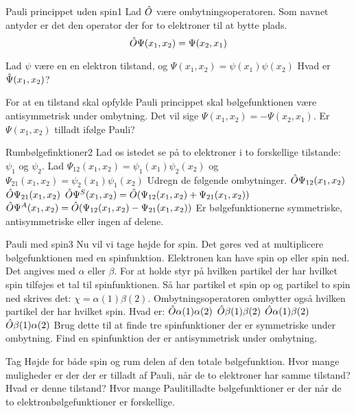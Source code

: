 \documentclass[../../Atom-ogMolekylefysik.tex]{subfiles}
\begin{document}
\begin{opgave}{Pauli princippet uden spin}{1}
Lad $\hat O$ være ombytningsoperatoren. Som navnet antyder er det den operator der for to elektroner til at bytte plads.
$$
\hat O \Psi(x_1,x_2) = \Psi(x_2,x_1)
$$

Lad $\psi$ være en en elektron tilstand, og $\Psi(x_1,x_2) = \psi(x_1)\psi(x_2)$
\opg Hvad er $\hat \Psi(x_1,x_2)$?

For at en tilstand skal opfylde Pauli princippet skal bølgefunktionen være antisymmetrisk under ombytning. Det vil sige $\Psi(x_1,x_2) = -\Psi(x_2,x_1)$.
\opg Er $\Psi(x_1,x_2)$ tilladt ifølge Pauli?
\end{opgave}

\begin{opgave}{Rumbølgefinktioner}{2}
Lad os istedet se på to elektroner i to forskellige tilstande: $\psi_1$ og $\psi_2$.
Lad $\Psi_{12}(x_1,x_2) = \psi_1(x_1)\psi_2(x_2)$ og $\Psi_{21}(x_1,x_2) = \psi_2(x_1)\psi_1(x_2)$
Udregn de følgende ombytninger.
\opg $\hat O \Psi_{12}(x_1,x_2)$
\opg $\hat O \Psi_{21}(x_1,x_2)$
\opg $\hat O \Psi^S(x_1,x_2)=\hat O (\Psi_{12}(x_1,x_2)+\Psi_{21}(x_1,x_2))$
\opg $\hat O \Psi^A(x_1,x_2)=\hat O (\Psi_{12}(x_1,x_2)-\Psi_{21}(x_1,x_2))$
\opg Er bølgefunktionerne symmetriske, antisymmetriske eller ingen af delene.
\end{opgave}

\begin{opgave}{Pauli med spin}{3}
Nu vil vi tage højde for spin. Det gøres ved at multiplicere bølgefunktionen med en spinfunktion. Elektronen kan have spin op eller spin ned. Det angives med $\alpha$ eller $\beta$. For at holde styr på hvilken partikel der har hvilket spin tilføjes et tal til spinfunktionen. Så har partikel et spin op og partikel to spin ned skrives det: $\chi=\alpha(1)\beta(2)$.
Ombytningsoperatoren ombytter også hvilken partikel der har hvilket spin.
Hvad er:
\opg $\hat O \alpha(1)\alpha(2)$
\opg $\hat O \beta(1)\beta(2)$
\opg $\hat O \alpha(1)\beta(2)$
\opg $\hat O \beta(1)\alpha(2)$
\opg Brug dette til at finde tre spinfunktioner der er symmetriske under ombytning.
\opg Find en spinfunktion der er antisymmetrisk under ombytning.

Tag Højde for både spin og rum delen af den totale bølgefunktion.
\opg Hvor mange muligheder er der der er tilladt af Pauli, når de to elektroner har samme tilstand?
\opg Hvad er denne tilstand?
\opg Hvor mange Paulitilladte bølgefunktioner er der når de to elektronbølgefunktioner er forskellige.
\end{opgave}
\end{document}
